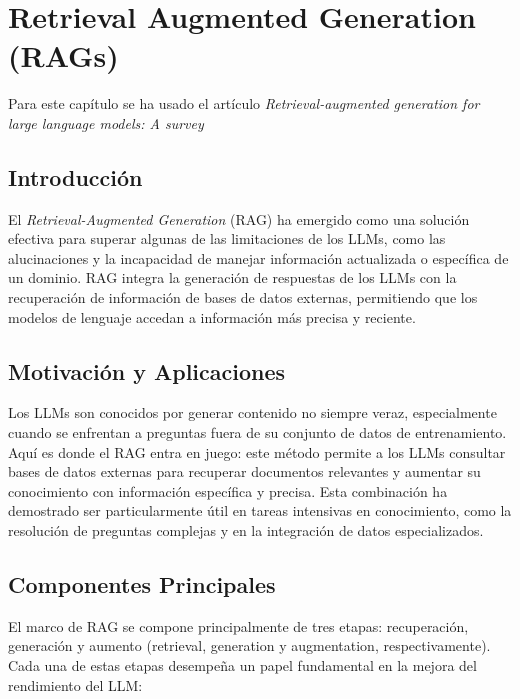 \cleardoublepage

\chapter{Retrieval Augmented Generation (RAGs)}
\label{Retrieval Augmented Generation (RAGs)}

Para este capítulo se ha usado el artículo \textit{Retrieval-augmented generation for large language models: A survey} \citep{gao2023retrieval}

\section{Introducción}

El \textit{Retrieval-Augmented Generation} (RAG) ha emergido como una solución efectiva para superar algunas de las limitaciones de los LLMs, como las alucinaciones y la incapacidad de manejar información actualizada o específica de un dominio. RAG integra la generación de respuestas de los LLMs con la recuperación de información de bases de datos externas, permitiendo que los modelos de lenguaje accedan a información más precisa y reciente.

\section{Motivación y Aplicaciones}

Los LLMs son conocidos por generar contenido no siempre veraz, especialmente cuando se enfrentan a preguntas fuera de su conjunto de datos de entrenamiento. Aquí es donde el RAG entra en juego: este método permite a los LLMs consultar bases de datos externas para recuperar documentos relevantes y aumentar su conocimiento con información específica y precisa. Esta combinación ha demostrado ser particularmente útil en tareas intensivas en conocimiento, como la resolución de preguntas complejas y en la integración de datos especializados.


\section{Componentes Principales}

El marco de RAG se compone principalmente de tres etapas: recuperación, generación y aumento (retrieval, generation y augmentation, respectivamente). Cada una de estas etapas desempeña un papel fundamental en la mejora del rendimiento del LLM:

